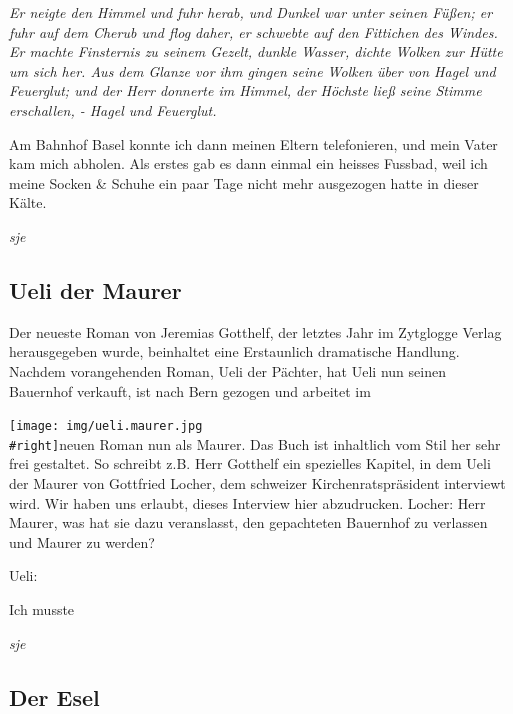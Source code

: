 \documentclass[
]{article}
\begin{document}
\emph{Er neigte den Himmel und fuhr herab, und Dunkel war unter seinen
Füßen; er fuhr auf dem Cherub und flog daher, er schwebte auf den
Fittichen des Windes. Er machte Finsternis zu seinem Gezelt, dunkle
Wasser, dichte Wolken zur Hütte um sich her. Aus dem Glanze vor ihm
gingen seine Wolken über von Hagel und Feuerglut; und der Herr donnerte
im Himmel, der Höchste ließ seine Stimme erschallen, - Hagel und
Feuerglut.}

Am Bahnhof Basel konnte ich dann meinen Eltern telefonieren, und mein
Vater kam mich abholen. Als erstes gab es dann einmal ein heisses
Fussbad, weil ich meine Socken \& Schuhe ein paar Tage nicht mehr
ausgezogen hatte in dieser Kälte.

\emph{sje}

\hypertarget{ueli-der-maurer}{%
\subsection{Ueli der Maurer}\label{ueli-der-maurer}}

Der neueste Roman von Jeremias Gotthelf, der letztes Jahr im Zytglogge
Verlag herausgegeben wurde, beinhaltet eine Erstaunlich dramatische
Handlung. Nachdem vorangehenden Roman, Ueli der Pächter, hat Ueli nun
seinen Bauernhof verkauft, ist nach Bern gezogen und arbeitet im

\texttt{[image: img/ueli.maurer.jpg\\\#right]}neuen Roman nun als Maurer.
Das Buch ist inhaltlich vom Stil her sehr frei gestaltet. So schreibt
z.B. Herr Gotthelf ein spezielles Kapitel, in dem Ueli der Maurer von
Gottfried Locher, dem schweizer Kirchenratspräsident interviewt wird.
Wir haben uns erlaubt, dieses Interview hier abzudrucken. Locher: Herr
Maurer, was hat sie dazu veranslasst, den gepachteten Bauernhof zu
verlassen und Maurer zu werden?

Ueli:

Ich musste

\emph{sje}

\hypertarget{der-esel}{%
\subsection{Der Esel}\label{der-esel}}
\end{document}
